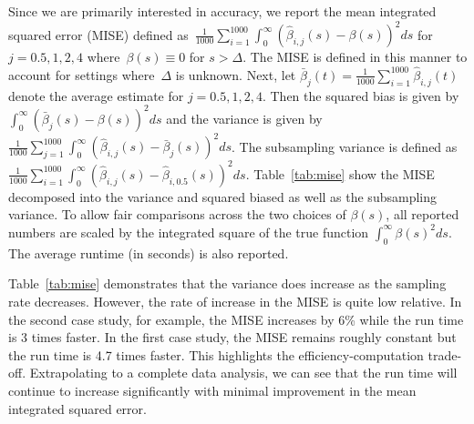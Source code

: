 \documentclass[12pt]{amsart}
\begin{document}
Since we are primarily interested in accuracy, we report the mean integrated squared error (MISE) defined as~$\frac{1}{1000} \sum_{i=1}^{1000} \int_{0}^{\infty} ( \hat \beta_{i,j} (s) - \beta(s))^2 ds$ for $j=0.5,1,2,4$ where~$\beta(s) \equiv 0$ for $s > \Delta$.  The MISE is defined in this manner to account for settings where~$\Delta$ is unknown.  Next, let $\bar \beta_{j} (t) = \frac{1}{1000} \sum_{i=1}^{1000} \hat \beta_{i,j} (t)$ denote the average estimate for $j=0.5,1,2,4$.  Then the squared bias is given by $\int_{0}^{\infty} ( \bar \beta_{j} (s) - \beta (s))^2 ds$ and the variance is given by $\frac{1}{1000} \sum_{j=1}^{1000} \int_{0}^{\infty} ( \hat \beta_{i,j} (s) - \bar \beta_j(s))^2 ds$.  The subsampling variance is defined as $\frac{1}{1000} \sum_{i=1}^{1000} \int_{0}^{\infty} ( \hat \beta_{i,j} (s) - \hat \beta_{i,0.5} (s))^2 ds$.  Table~\ref{tab:mise} show the MISE decomposed into the variance and squared biased as well as the subsampling variance.  To allow fair comparisons across the two choices of $\beta(s)$, all reported numbers are scaled by the integrated square of the true function $\int_{0}^{\infty} \beta(s)^2 ds$. The average runtime (in seconds) is also reported.

Table~\ref{tab:mise} demonstrates that the variance does increase as the sampling rate decreases.  However, the rate of increase in the MISE is quite low relative.  In the second case study, for example, the MISE increases by 6\% while the run time is 3 times faster.  In the first case study, the MISE remains roughly constant but the run time is 4.7 times faster.  This highlights the efficiency-computation trade-off.  Extrapolating to a complete data analysis, we can see that the run time will continue to increase significantly with minimal improvement in the mean integrated squared error.
\end{document}

